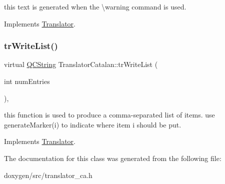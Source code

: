 this text is generated when the \textbackslash{}warning command is used. 

Implements \mbox{\hyperlink{class_translator}{Translator}}.

\mbox{\label{class_translator_catalan_ab305b521c2f0f55c61e6fabf9c731660}} 
\subsubsection{\texorpdfstring{trWriteList()}{trWriteList()}}
{\footnotesize\ttfamily virtual \mbox{\hyperlink{class_q_c_string}{Q\+C\+String}} Translator\+Catalan\+::tr\+Write\+List (\begin{DoxyParamCaption}\item[{int}]{num\+Entries }\end{DoxyParamCaption})\hspace{0.3cm}{\ttfamily [inline]}, {\ttfamily [virtual]}}

this function is used to produce a comma-\/separated list of items. use generate\+Marker(i) to indicate where item i should be put. 

Implements \mbox{\hyperlink{class_translator}{Translator}}.



The documentation for this class was generated from the following file\+:\begin{DoxyCompactItemize}
\item 
doxygen/src/translator\+\_\+ca.\+h\end{DoxyCompactItemize}
